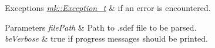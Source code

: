 \begin{DoxyExceptions}{Exceptions}
{\em \hyperlink{classmk_1_1_exception__t}{mk\+::\+Exception\+\_\+t}} & if an error is encountered. \\
\hline
\end{DoxyExceptions}

\begin{DoxyParams}{Parameters}
{\em file\+Path} & Path to .sdef file to be parsed. \\
\hline
{\em be\+Verbose} & true if progress messages should be printed. \\
\hline
\end{DoxyParams}
